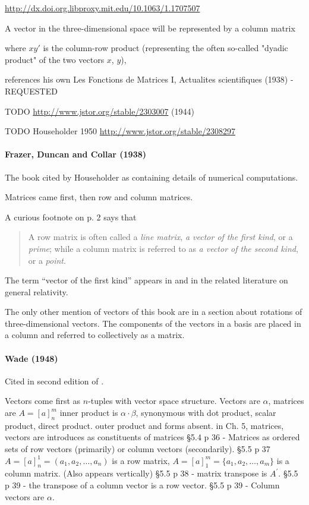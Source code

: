\url{http://dx.doi.org.libproxy.mit.edu/10.1063/1.1707507}

A vector in the three-dimensional space will
be represented by a column matrix

where $xy'$ is the column-row product (representing
the often so-called "dyadic product" of the
two vectors $x$, $y$),

references his own Les Fonctions de Matrices I, Actualites
scientifiques (1938) - REQUESTED

TODO \url{http://www.jstor.org/stable/2303007} (1944)

TODO Householder 1950 \url{http://www.jstor.org/stable/2308297}


\paragraph{Frazer, Duncan and Collar (1938)~\cite{Frazer1938}}

The book cited by Householder as containing details of numerical computations.

Matrices came first, then row and column matrices.

A curious footnote on p. 2 says that
\begin{quote}
    A row matrix is often called a \textit{line matrix}, \textit{a vector of the first kind},
    or a \textit{prime}; while a column matrix is referred to as \textit{a vector of the second kind}, or a \textit{point}.
\end{quote}

The term ``vector of the first kind'' appears in \cite{Silberstein1914} and in
the related literature on general relativity.

The only other mention of vectors of this book are in a section about rotations
of three-dimensional vectors. The components of the vectors in a basis are
placed in a column and referred to collectively as a matrix.


\paragraph{Wade (1948)~\cite{Wade1948}}

Cited in second edition of \cite{Margenau1943}.

Vectors come first as $n$-tuples with vector space structure.
Vectors are $\alpha$, matrices are $A = [a]^m_n$
inner product is $\alpha \cdot \beta$, synonymous with dot product, scalar product, direct product.
outer product and forms absent.
in Ch. 5, matrices, vectors are introduces as constituents of matrices
\S 5.4 p 36 - Matrices as ordered sets of row vectors (primarily) or column vectors (secondarily).
\S 5.5 p 37 $A = [a]^1_n = (a_1, a_2, \dots, a_n)$ is a row matrix,
$A = [a]^m_1 = \{a_1, a_2, \dots, a_m \}$ is a column matrix. (Also appears vertically)
\S 5.5 p 38 - matrix transpose is $A^\prime$.
\S 5.5 p 39 - the transpose of a column vector is a row vector.
\S 5.5 p 39 - Column vectors are $\alpha$.



